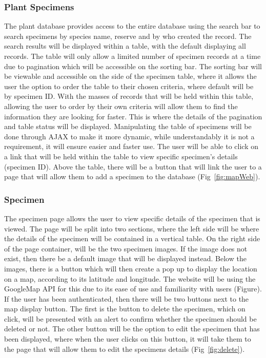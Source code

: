         \subsubsection{Plant Specimens}
           The plant database provides access to the entire database using the search bar to search specimens by species name, reserve and by who created the record. The search results will be displayed within a table, with the default displaying all records. The table will only allow a limited number of specimen records at a time due to pagination which will be accessible on the sorting bar. The sorting bar will be viewable and accessible on the side of the specimen table, where it allows the user the option to order the table to their chosen criteria, where default will be by specimen ID. With the masses of records that will be held within this table, allowing the user to order by their own criteria will allow them to find the information they are looking for faster. This is where the details of the pagination and table status will be displayed. Manipulating the table of specimens will be done through AJAX to make it more dynamic, while understandably it is not a requirement, it will ensure easier and faster use.
The user will be able to click on a link that will be held within the table to view specific specimen’s details (specimen ID). Above the table, there will be a button that will link the user to a page that will allow them to add a specimen to the database
(Fig~\ref{fig:mapWeb}).

        \subsubsection{Specimen}
     The specimen page allows the user to view specific details of the specimen that is viewed. The page will be split into two sections, where the left side will be where the details of the specimen will be contained in a vertical table. On the right side of the page container, will be the two specimen images. If the image does not exist, then there be a default image that will be displayed instead. Below the images, there is a button which will then create a pop up to display the location on a map, according to its latitude and longitude. The website will be using the GoogleMap API for this due to its ease of use and familiarity with users (Figure). If the user has been authenticated, then there will be two buttons next to the map display button. The first is the button to delete the specimen, which on click, will be presented with an alert to confirm whether the specimen should be deleted or not. The other button will be the option to edit the specimen that has been displayed, where when the user clicks on this button, it will take them to the page that will allow them to edit the specimens details  (Fig~\ref{fig:delete}).

